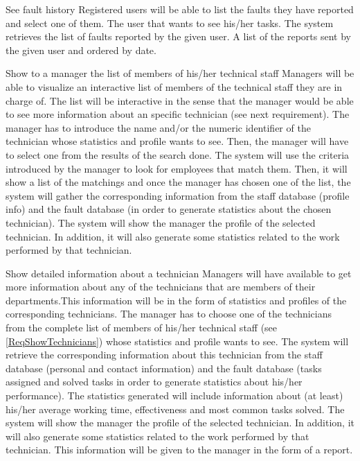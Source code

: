 \begin{requirement}{See fault history}\label{A4-MyFaultHistory}
\reqdesc Registered users will be able to list the faults they have reported and select one of them.
\reqin The user that wants to see his/her tasks.
\reqsteps The system retrieves the list of faults reported by the given user.
\reqout A list of the reports sent by the given user and ordered by date.
\end{requirement}

\begin{requirement}{Show to a manager the list of members of his/her technical staff}\label{ReqShowTechnicians}
\reqdesc Managers will be able to visualize an interactive list of members of the technical staff they are in charge of. The list will be interactive in the sense that the manager would be able to see more information about an specific technician (see next requirement).
\reqin The manager has to introduce the name and/or the numeric identifier of the technician whose statistics and profile wants to see. Then, the manager will have to select one from the results of the search done.
\reqsteps The system will use the criteria introduced by the manager to look for employees that match them. Then, it will show a list of the matchings and once the manager has chosen one of the list, the system will gather the corresponding information from the staff database (profile info) and the fault database (in order to generate statistics about the chosen technician).
\reqout The system will show the manager the profile of the selected technician. In addition, it will also generate some statistics related to the work performed by that technician.
\end{requirement}

\begin{requirement}{Show detailed information about a technician}
\reqdesc Managers will have available to get more information about any of the technicians that are members of their departments.This information will be in the form of statistics and profiles of the corresponding technicians.
\reqin The manager has to choose one of the technicians from the complete list of members of his/her technical staff (see \ref{ReqShowTechnicians}) whose statistics and profile wants to see.
\reqsteps The system will retrieve the corresponding information about this technician from the staff database (personal and contact information) and the fault database (tasks assigned and solved tasks in order to generate statistics about his/her performance). The statistics generated will include information about (at least) his/her average working time, effectiveness and most common tasks solved.
\reqout The system will show the manager the profile of the selected technician. In addition, it will also generate some statistics related to the work performed by that technician. This information will be given to the manager in the form of a report.
\end{requirement}


